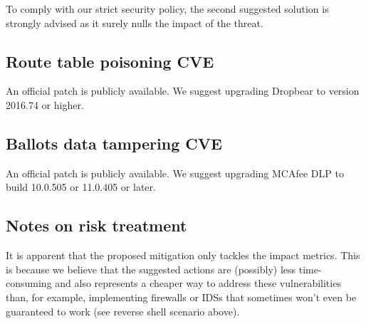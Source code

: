 To comply with our strict security policy, the second suggested solution is strongly advised as it surely nulls the impact of the threat.

\subsection*{Route table poisoning \- CVE}

An official patch is publicly available. We suggest upgrading Dropbear to version 2016.74 or higher.\cite{online:mitigation-cve-2016-7406}

\subsection*{Ballots data tampering \- CVE}

An official patch is publicly available. We suggest upgrading MCAfee DLP to build 10.0.505 or 11.0.405 or later.\cite{online:mitigation-cve-2018-6683}

\subsection*{Notes on risk treatment}

It is apparent that the proposed mitigation only tackles the impact metrics. This is because we believe that the suggested actions are (possibly) less time-consuming and also represents a cheaper way to address these vulnerabilities than, for example, implementing firewalls or IDSs that sometimes won't even be guaranteed to work (see reverse shell scenario above).
